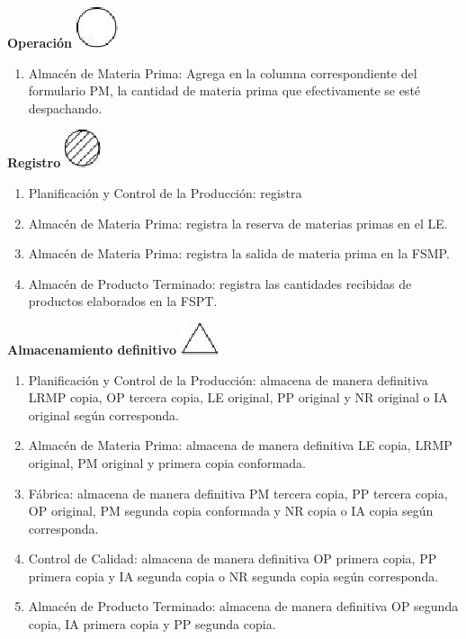 \begin{center}
  \textbf{Operación}
  \includegraphics{./Images/Simbolos/simbolo-Operacion.png}
\end{center}
\begin{enumerate}
  \item Almac\'en de Materia Prima: Agrega en la columna correspondiente del formulario PM, la cantidad de materia prima que efectivamente se est\'e despachando.
\end{enumerate}

\begin{center}
  \textbf{Registro}
  \includegraphics{./Images/Simbolos/simbolo-Registro.png}
\end{center}
\begin{enumerate}
  \item Planificaci\'on y Control de la Producci\'on: registra
  \item Almac\'en de Materia Prima: registra la reserva de materias primas en el LE.
  \item Almac\'en de Materia Prima: registra la salida de materia prima en la FSMP.
  \item Almac\'en de Producto Terminado: registra las cantidades recibidas de productos elaborados en la FSPT.
\end{enumerate}

\begin{center}
  \textbf{Almacenamiento definitivo}
  \includegraphics{./Images/Simbolos/simbolo-Almacenamiento-Definitivo.png}
\end{center}
\begin{enumerate}
  \item Planificaci\'on y Control de la Producci\'on: almacena de manera definitiva LRMP copia, OP tercera copia, LE original, PP original y NR original o IA original seg\'un corresponda.
  \item Almac\'en de Materia Prima: almacena de manera definitiva LE copia, LRMP original, PM original y primera copia conformada. 
  \item F\'abrica: almacena de manera definitiva PM tercera copia, PP tercera copia, OP original, PM segunda copia conformada y NR copia o IA copia seg\'un corresponda.
  \item Control de Calidad: almacena de manera definitiva OP primera copia, PP primera copia y IA segunda copia o NR segunda copia seg\'un corresponda.
  \item Almac\'en de Producto Terminado: almacena de manera definitiva OP segunda copia, IA primera copia y PP segunda copia.
\end{enumerate}

